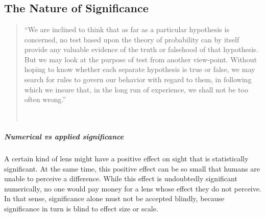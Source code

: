 
\newcommand{\hnaught}{\textit{H}\textsubscript{\addfontfeature{Numbers=Lining}0}}
\newcommand{\hone}{\textit{H}\textsubscript{\addfontfeature{Numbers=Lining}1}}


\chapter{\significance}
\label{ch:significance}

\section{The Nature of Significance}
\label{sec:significancenature}

\begin{quote}\small\singlespacing
``We are inclined to think that as far as a particular hypothesis is concerned, no test based upon the theory of probability can by itself provide any valuable evidence of the truth or falsehood of that hypothesis. But we may look at the purpose of test from another view-point. Without hoping to know whether each separate hypothesis is true or false, we may search for rules to govern our behavior with regard to them, in following which we insure that, in the long run of experience, we shall not be too often wrong.''

~ \hfill \citep[]{neyman33}
\end{quote}

\paragraph{Numerical vs applied significance} A certain kind of lens might have a positive effect on sight that is statistically significant. At the same time, this positive effect can be so small that humans are unable to perceive a difference. While this effect is undoubtedly significant numerically, no one would pay money for a lens whose effect they do not perceive. In that sense, significance alone must not be accepted blindly, because significance in turn is blind to effect size or scale.

